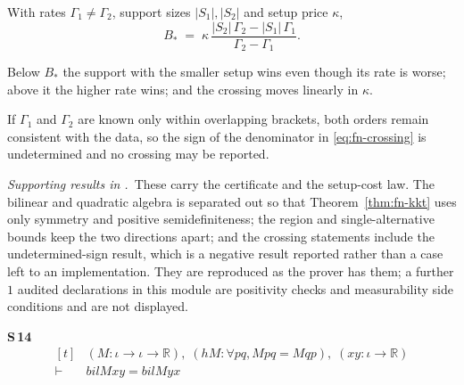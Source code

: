 \begin{theorem}
\label{thm:fn-crossing}
With rates $\Gamma_{1}\neq\Gamma_{2}$, support sizes $|S_{1}|,|S_{2}|$ and setup price
$\kappa$,
\begin{equation}
B_{*}\;=\;\kappa\,\frac{|S_{2}|\,\Gamma_{2}-|S_{1}|\,\Gamma_{1}}{\Gamma_{2}-\Gamma_{1}} .
\label{eq:fn-crossing}
\end{equation}
\end{theorem}


Below $B_{*}$ the support with the smaller setup wins even though its rate is worse; above it
the higher rate wins; and the crossing moves linearly in $\kappa$.

\begin{theorem}
\label{thm:fn-undecided}
If $\Gamma_{1}$ and $\Gamma_{2}$ are known only within overlapping brackets, both orders
remain consistent with the data, so the sign of the denominator in \eqref{eq:fn-crossing} is
undetermined and no crossing may be reported.
\end{theorem}


\noindent\emph{Supporting results in .}~These carry the certificate and the setup-cost law. The bilinear and quadratic algebra is separated out so that Theorem~\ref{thm:fn-kkt} uses only symmetry and positive semidefiniteness; the region and single-alternative bounds keep the two directions apart; and the crossing statements include the undetermined-sign result, which is a negative result reported rather than a case left to an implementation. They are reproduced as the prover has them; a further $1$ audited declarations in this module are positivity checks and measurability side conditions and are not displayed.

\noindent\textbf{S\,14}\quad{}
{\footnotesize\[ \begin{aligned}[t]
&(\mathit{M} : \iota \to \iota \to \mathbb{R} ),\; (\mathit{hM} : \forall \mathit{p} \mathit{q}, \mathit{M} \mathit{p} \mathit{q} = \mathit{M} \mathit{q} \mathit{p}),\; (\mathit{x} \mathit{y} : \iota \to \mathbb{R} )\\
\vdash\;&\mathit{bil} \mathit{M} \mathit{x} \mathit{y} = \mathit{bil} \mathit{M} \mathit{y} \mathit{x}
\end{aligned} \]}

